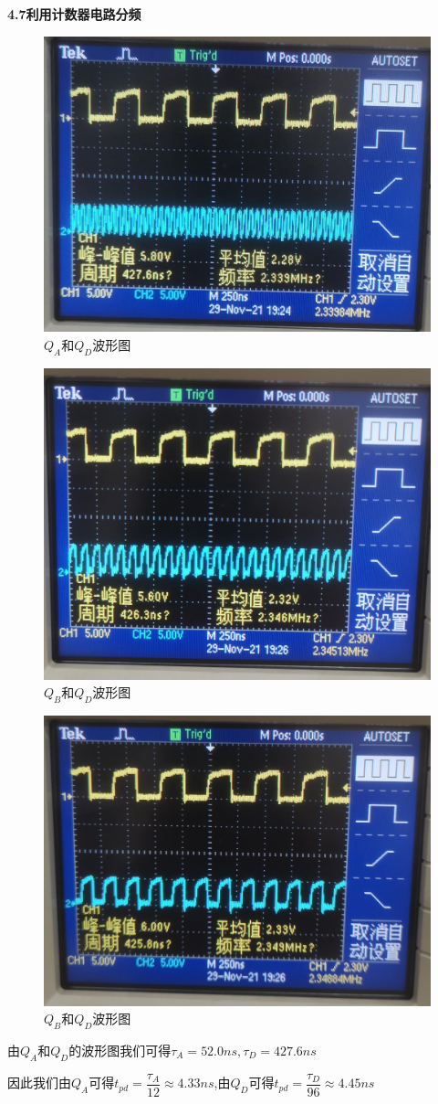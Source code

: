 \documentclass[a4 paper,12pt]{article}
\begin{document}
    \noindent
    \textbf{4.7利用计数器电路分频}
    	\begin{figure}[H]
    		\centering
    		\hspace{2em}\includegraphics[width=.4\linewidth]{pic/2.jpg}
    		\caption{$Q_{A}$和$Q_{D}$波形图
    		}
    	\end{figure}
    	\begin{figure}[H]
    		\centering
    		\hspace{2em}\includegraphics[width=.4\linewidth]{pic/3.jpg}
    		\caption{$Q_{B}$和$Q_{D}$波形图
    		}
    	\end{figure}
    	\begin{figure}[H]
    		\centering
    		\hspace{2em}\includegraphics[width=.4\linewidth]{pic/4.jpg}
    		\caption{$Q_{B}$和$Q_{D}$波形图
    		}
    	\end{figure} 
    \par 由$Q_{A}$和$Q_{D}$的波形图我们可得$\tau_{A}=52.0ns,\tau_{D}=427.6ns$
    \par 因此我们由$Q_{A}$可得$t_{pd}=\dfrac{\tau_{A}}{12}\approx4.33ns$,由$Q_{D}$可得$t_{pd}=\dfrac{\tau_{D}}{96}\approx4.45ns$   
\end{document}
